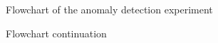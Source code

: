  \begin{figure}
%
  \caption{Flowchart of the anomaly detection experiment}
  \label{fig:key}
\end{figure}

 \begin{figure}
%
  \caption{Flowchart continuation}
  \label{fig:key}
\end{figure}

